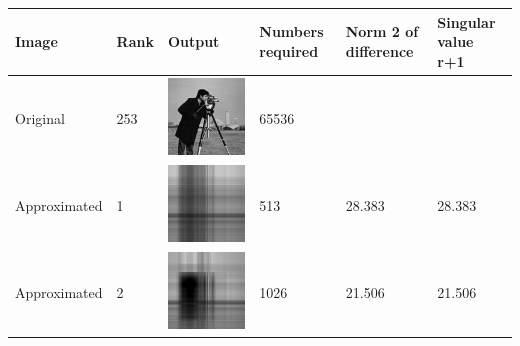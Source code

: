 \documentclass[a4paper]{article}
\numberwithin{equation}{section} %
\begin{document}
\begin{minipage}{\linewidth}
 \label{tab:SVD_image_results} 
\begin{center}
\begin{tabular}{| m{} | m{} | m{}  | m{} | m{} | m{}|}
\hline   
    \textbf{Image} & \textbf{Rank} & \textbf{Output} & \textbf{Numbers required} & \textbf{Norm 2 of difference} & \textbf{Singular value r+1} \\
\hline 
\hline
Original & 253 & \includegraphics[scale=.27] {cameraman.png} & 65536 & &\\
\hline
Approximated & 1 & \includegraphics[scale=.27] {rank1.png} & 513 & 28.383 & 28.383\\
\hline
Approximated & 2 & \includegraphics[scale=.27] {rank2.png} & 1026 & 21.506 & 21.506\\

\end{tabular}
\end{center}
\end{minipage}
\end{document}

